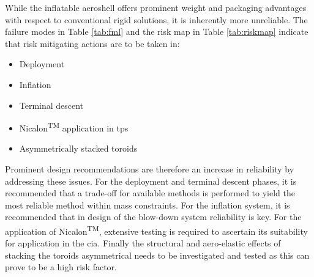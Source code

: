 While the inflatable aeroshell offers prominent weight and packaging advantages with respect to conventional rigid solutions, it is inherently more unreliable. The failure modes in Table \ref{tab:fml} and the risk map in Table \ref{tab:riskmap} indicate that risk mitigating actions are to be taken in:
\begin{itemize}
\item Deployment
\item Inflation
\item Terminal descent
\item Nicalon\textsuperscript{TM} application in \gls{tps}
\item Asymmetrically stacked toroids
\end{itemize}
Prominent design recommendations are therefore an increase in reliability by addressing these issues. For the deployment and terminal descent phases, it is recommended that a trade-off for available methods is performed to yield the most reliable method within mass constraints. For the inflation system, it is recommended that in design of the blow-down system reliability is key. For the application of Nicalon\textsuperscript{TM}, extensive testing is required to ascertain its suitability for application in the \gls{cia}. Finally the structural and aero-elastic effects of stacking the toroids asymmetrical needs to be investigated and tested as this can prove to be a high risk factor.